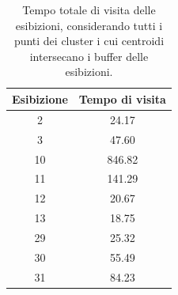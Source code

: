 \documentclass[12pt]{article}
\begin{document}
\begin{table}[!ht]
    \centering
    \begin{tabular}{|c|c|}
        \hline
        \textbf{Esibizione} & \textbf{Tempo di visita} \\ \hline
        2                   & 24.17                    \\ \hline
        3                   & 47.60                    \\ \hline
        10                  & 846.82                   \\ \hline
        11                  & 141.29                   \\ \hline
        12                  & 20.67                    \\ \hline
        13                  & 18.75                    \\ \hline
        29                  & 25.32                    \\ \hline
        30                  & 55.49                    \\ \hline
        31                  & 84.23                    \\ \hline
    \end{tabular}
    \caption{Tempo totale di visita delle esibizioni, considerando tutti i punti dei cluster i cui centroidi intersecano i buffer delle esibizioni.}
    \label{exhibits_time_visiting_cluster}
\end{table}
\end{document}
